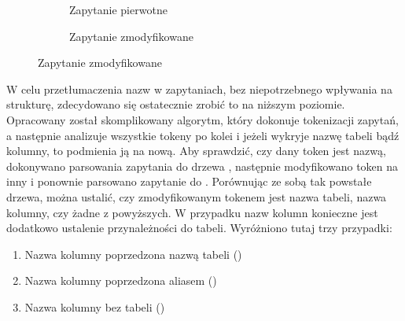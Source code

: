 \begin{figure}[ht!]
\centering
\begin{subfigure}{0.48\textwidth}
    \begin{minipage}{\linewidth}
        
    \end{minipage}
    \caption{Zapytanie pierwotne}
    \label{fig:sqlglot-before}
\end{subfigure}
\hfill
\begin{subfigure}{0.48\textwidth}
    \begin{minipage}{\linewidth}
        
    \end{minipage}
    \caption{Zapytanie zmodyfikowane}
    \label{fig:sqlglot-after}
\end{subfigure}
\label{fig:sqlglot-translation}
\end{figure}

W celu przetłumaczenia nazw w zapytaniach, bez niepotrzebnego wpływania na strukturę, zdecydowano się ostatecznie zrobić to na niższym poziomie. Opracowany został skomplikowany algorytm, który dokonuje tokenizacji zapytań, a następnie analizuje wszystkie tokeny po kolei i jeżeli wykryje nazwę tabeli bądź kolumny, to podmienia ją na nową. Aby sprawdzić, czy dany token jest nazwą, dokonywano parsowania zapytania do drzewa , następnie modyfikowano token na inny i ponownie parsowano zapytanie do . Porównując ze sobą tak powstałe drzewa, można ustalić, czy zmodyfikowanym tokenem jest nazwa tabeli, nazwa kolumny, czy żadne z powyższych. W przypadku nazw kolumn konieczne jest dodatkowo ustalenie przynależności do tabeli. Wyróżniono tutaj trzy przypadki:

\begin{enumerate}
    \item Nazwa kolumny poprzedzona nazwą tabeli ()
    \item Nazwa kolumny poprzedzona aliasem ()
    \item Nazwa kolumny bez tabeli ()
\end{enumerate}

